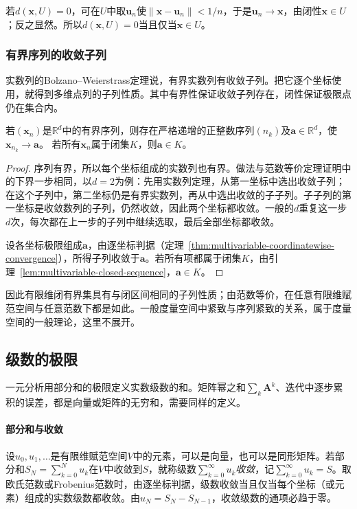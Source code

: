 若$d(\bm x,U)=0$，可在$U$中取$\bm u_n$使$\lVert\bm x-\bm u_n\rVert<1/n$，于是$\bm u_n\to\bm x$，由闭性$\bm x\in U$；反之显然。所以$d(\bm x,U)=0$当且仅当$\bm x\in U$。

\subsubsection{有界序列的收敛子列}
\label{sec:multivariable-bolzano-weierstrass-section}

实数列的Bolzano--Weierstrass定理说，有界实数列有收敛子列。把它逐个坐标使用，就得到多维点列的子列性质。其中有界性保证收敛子列存在，闭性保证极限点仍在集合内。
\begin{theorem}[有限维有界序列的收敛子列]
\label{thm:multivariable-bolzano-weierstrass}
若$(\bm x_n)$是$\mathbb R^d$中的有界序列，则存在严格递增的正整数序列$(n_k)$及$\bm a\in\mathbb R^d$，使$\bm x_{n_k}\to\bm a$。
若所有$\bm x_n$属于闭集$K$，则$\bm a\in K$。
\end{theorem}
\begin{proof}
序列有界，所以每个坐标组成的实数列也有界。做法与范数等价定理证明中的下界一步相同，以$d=2$为例：先用实数列定理，从第一坐标中选出收敛子列；在这个子列中，第二坐标仍是有界实数列，再从中选出收敛的子子列。子子列的第一坐标是收敛数列的子列，仍然收敛，因此两个坐标都收敛。一般的$d$重复这一步$d$次，每次都在上一步的子列中继续选取，最后全部坐标都收敛。

设各坐标极限组成$\bm a$，由逐坐标判据（定理~\ref{thm:multivariable-coordinatewise-convergence}），所得子列收敛于$\bm a$。若所有项都属于闭集$K$，由引理~\ref{lem:multivariable-closed-sequence}，$\bm a\in K$。
\end{proof}
因此有限维闭有界集具有与闭区间相同的子列性质；由范数等价，在任意有限维赋范空间与任意范数下都是如此。一般度量空间中紧致与序列紧致的关系，属于度量空间的一般理论，这里不展开。

\subsection{级数的极限}
\label{sec:ls-vector-matrix-series}

一元分析用部分和的极限定义实数级数的和。矩阵幂之和$\sum_k\bm A^k$、迭代中逐步累积的误差，都是向量或矩阵的无穷和，需要同样的定义。

\paragraph{部分和与收敛}
设$u_0,u_1,\ldots$是有限维赋范空间$V$中的元素，可以是向量，也可以是同形矩阵。若部分和$S_N=\sum_{k=0}^Nu_k$在$V$中收敛到$S$，就称级数$\sum_{k=0}^\infty u_k$\emph{收敛}，记$\sum_{k=0}^\infty u_k=S$。取欧氏范数或Frobenius范数时，由逐坐标判据，级数收敛当且仅当每个坐标（或元素）组成的实数级数都收敛。由$u_N=S_N-S_{N-1}$，收敛级数的通项必趋于零。

